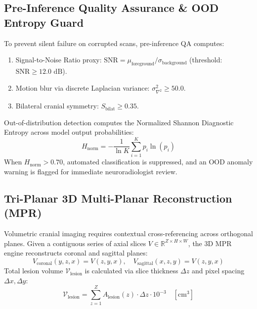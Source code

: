 \documentclass[journal,twocolumn,10pt]{IEEEtran}
\begin{document}
\subsection{Pre-Inference Quality Assurance \& OOD Entropy Guard}
To prevent silent failure on corrupted scans, pre-inference QA computes:
\begin{enumerate}
    \item Signal-to-Noise Ratio proxy: $\text{SNR} = \mu_{\text{foreground}} / \sigma_{\text{background}}$ (threshold: $\text{SNR} \ge 12.0\text{ dB}$).
    \item Motion blur via discrete Laplacian variance: $\sigma_{\nabla^2}^2 \ge 50.0$.
    \item Bilateral cranial symmetry: $S_{\text{bilat}} \ge 0.35$.
\end{enumerate}
Out-of-distribution detection computes the Normalized Shannon Diagnostic Entropy across model output probabilities:
\begin{equation}
    H_{\text{norm}} = -\frac{1}{\ln K} \sum_{i=1}^K p_i \ln(p_i)
    \label{eq:entropy}
\end{equation}
When $H_{\text{norm}} > 0.70$, automated classification is suppressed, and an OOD anomaly warning is flagged for immediate neuroradiologist review.

\subsection{Tri-Planar 3D Multi-Planar Reconstruction (MPR)}
Volumetric cranial imaging requires contextual cross-referencing across orthogonal planes. Given a contiguous series of axial slices $V \in \mathbb{R}^{Z \times H \times W}$, the 3D MPR engine reconstructs coronal and sagittal planes:
\begin{equation}
    V_{\text{coronal}}(y, z, x) = V(z, y, x), \quad V_{\text{sagittal}}(x, z, y) = V(z, y, x)
\end{equation}
Total lesion volume $\mathcal{V}_{\text{lesion}}$ is calculated via slice thickness $\Delta z$ and pixel spacing $\Delta x, \Delta y$:
\begin{equation}
    \mathcal{V}_{\text{lesion}} = \sum_{z=1}^Z A_{\text{lesion}}(z) \cdot \Delta z \cdot 10^{-3} \quad \left[\text{cm}^3\right]
\end{equation}

\end{document}

